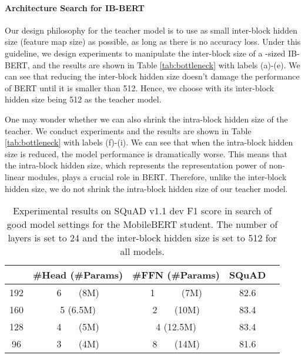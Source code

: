 \documentclass[11pt,a4paper]{article}
\begin{document}
\paragraph{Architecture Search for IB-BERT}

Our design philosophy for the teacher model is to use as small inter-block hidden size (feature map size) as possible, as long as there is no accuracy loss. Under this guideline, we design experiments to manipulate the inter-block size of a -sized IB-BERT, and the results are shown in Table \ref{tab:bottleneck} with labels (a)-(e).
We can see that reducing the inter-block hidden size doesn't damage the performance of BERT until it is smaller than 512. Hence, we choose  with its inter-block hidden size being 512 as the teacher model.


One may wonder whether we can also shrink the intra-block hidden size of the teacher. We conduct experiments and the results are shown in Table \ref{tab:bottleneck} with labels (f)-(i).  We can see that when the intra-block hidden size is reduced, the model performance is dramatically worse. This means that the intra-block hidden size, which represents the representation power of non-linear modules, plays a crucial role in BERT. 
Therefore, unlike the inter-block hidden size, we do not shrink the intra-block hidden size of our teacher model.






\setlength{\tabcolsep}{2pt}
\begin{table}[t]
    \centering
    \small
	\begin{tabular}{c c c c c}
		\hline
		  & \textbf{\#Head (\#Params)} & \textbf{\#FFN (\#Params)} & \textbf{SQuAD}\\
		\hline
		192 & 6 \ \ \ (8M) & 1 \ \ \ \ \ (7M)  & 82.6 \\
		160 & 5 (6.5M) & 2 \ \ \ (10M)  & 83.4 \\			
		128 & 4 \ \ \ (5M) & 4 (12.5M)  & 83.4 \\
		96 & 3 \ \ \ (4M) & 8 \ \ \ (14M)  & 81.6 \\
		\hline
\end{tabular}
	\caption{Experimental results on SQuAD v1.1 dev F1 score in search of good model settings for the MobileBERT student. The number of layers is set to 24 and the inter-block hidden size is set to 512 for all models. }
	\label{tab:bottleneck2}
\end{table}
\setlength{\tabcolsep}{6pt}

\setlength{\tabcolsep}{2pt}
\end{document}
